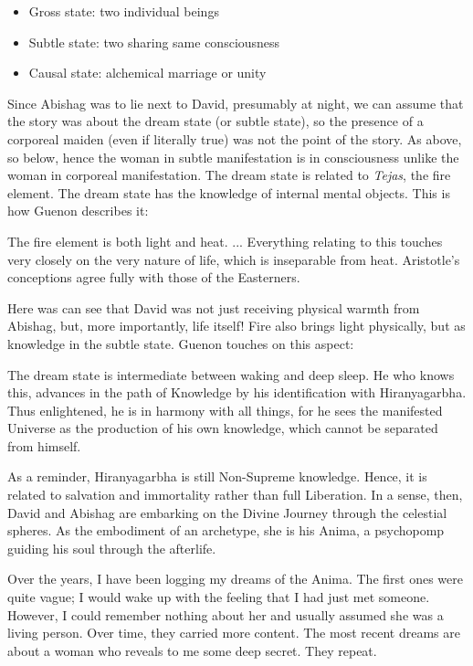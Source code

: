 \begin{itemize}


\item Gross state: two individual beings

\item Subtle state: two sharing same consciousness

\item Causal state: alchemical marriage or unity
\end{itemize}


Since Abishag was to lie next to David, presumably at night, we can assume that the story was about the dream state (or subtle state), so the presence of a corporeal maiden (even if literally true) was not the point of the story. As above, so below, hence the woman in subtle manifestation is in consciousness unlike the woman in corporeal manifestation. The dream state is related to \emph{Tejas}, the fire element. The dream state has the knowledge of internal mental objects. This is how Guenon describes it:

\begin{quotex}
The fire element is both light and heat. ... Everything relating to this touches very closely on the very nature of life, which is inseparable from heat. Aristotle's conceptions agree fully with those of the Easterners.
\end{quotex}


Here was can see that David was not just receiving physical warmth from Abishag, but, more importantly, life itself! Fire also brings light physically, but as knowledge in the subtle state. Guenon touches on this aspect:

\begin{quotex}
The dream state is intermediate between waking and deep sleep. He who knows this, advances in the path of Knowledge by his identification with Hiranyagarbha. Thus enlightened, he is in harmony with all things, for he sees the manifested Universe as the production of his own knowledge, which cannot be separated from himself.
\end{quotex}


As a reminder, Hiranyagarbha is still Non-Supreme knowledge. Hence, it is related to salvation and immortality rather than full Liberation. In a sense, then, David and Abishag are embarking on the Divine Journey through the celestial spheres. As the embodiment of an archetype, she is his Anima, a psychopomp guiding his soul through the afterlife.

Over the years, I have been logging my dreams of the Anima. The first ones were quite vague; I would wake up with the feeling that I had just met someone. However, I could remember nothing about her and usually assumed she was a living person. Over time, they carried more content. The most recent dreams are about a woman who reveals to me some deep secret. They repeat.


